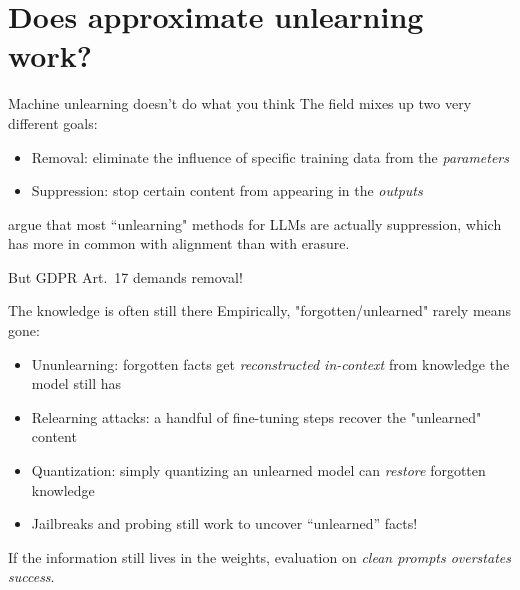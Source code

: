 \documentclass[12pt,aspectratio=169,handout]{beamer}
\begin{document}
\section{Does approximate unlearning work?}


\begin{frame}{Machine unlearning doesn't do what you think}
    The field mixes up two very different goals:

\begin{itemize}
    \item \alert{Removal}: eliminate the influence of specific training
          data from the \emph{parameters}
    \item \alert{Suppression}: stop certain content from appearing in the
          \emph{outputs}
\end{itemize}


\citet{cooper2025machine} argue that most ``unlearning" methods for LLMs are actually \alert{suppression}, which has more in common with alignment than with erasure. 


But GDPR Art.~17 demands \alert{removal}!


    
\end{frame}


\begin{frame}{The knowledge is often still there}
Empirically, "forgotten/unlearned" rarely means gone:
\begin{itemize}
    \item \alert{Ununlearning}: forgotten facts get \emph{reconstructed
          in-context} from knowledge the model still has
    \item \alert{Relearning attacks}: a handful of fine-tuning steps
          recover the "unlearned" content
    \item \alert{Quantization}: simply quantizing an unlearned model can
          \emph{restore} forgotten knowledge
    \item Jailbreaks and probing still work to uncover ``unlearned'' facts!
\end{itemize}
 

If the information still lives in the weights, evaluation on \emph{clean prompts overstates success}.
 

\end{frame}
\end{document}
